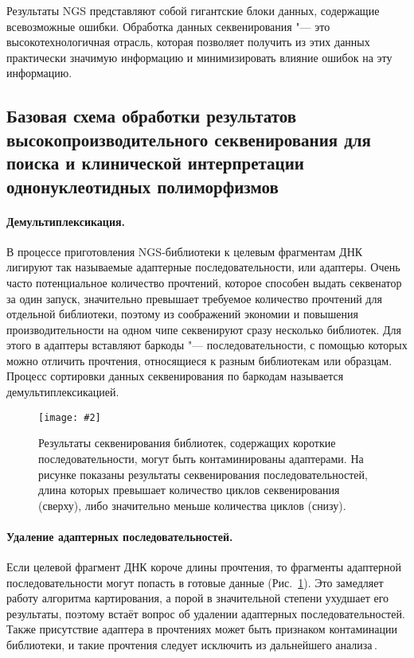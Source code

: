 \documentclass[a4paper,14pt]{extarticle}
\newcommand{\centerfigure}[5]
{\begin{figure}[#1]\centering\texttt{[image: \#2]}\caption{\label{#3}#4}\end{figure}}
\newcommand{\picref}[1]{Рис.~\ref{#1}}
\begin{document}
Результаты NGS представляют собой гигантские блоки данных, содержащие всевозможные ошибки.
Обработка данных секвенирования "--- это высокотехнологичная отрасль, которая позволяет получить из этих данных практически значимую информацию и минимизировать влияние ошибок на эту информацию.

\subsection{Базовая схема обработки результатов высокопроизводительного секвенирования для поиска и клинической интерпретации однонуклеотидных полиморфизмов}

\paragraph{Демультиплексикация.}
В процессе приготовления NGS\hyp{}библиотеки к целевым фрагментам ДНК лигируют так называемые адаптерные последовательности, или адаптеры.
Очень часто потенциальное количество прочтений, которое способен выдать секвенатор за один запуск, значительно превышает требуемое количество прочтений для отдельной библиотеки, поэтому из соображений экономии и повышения производительности на одном чипе секвенируют сразу несколько библиотек.
Для этого в адаптеры вставляют баркоды "--- последовательности, с помощью которых можно отличить прочтения, относящиеся к разным библиотекам или образцам.
Процесс сортировки данных секвенирования по баркодам называется демультиплексикацией.

\centerfigure{h}{Adapters.pdf}{fig:adapters}{Результаты секвенирования библиотек, содержащих короткие последовательности, могут быть контаминированы адаптерами. На рисунке показаны результаты секвенирования последовательностей, длина которых превышает количество циклов секвенирования (сверху), либо значительно меньше количества циклов (снизу).}{0.7}

\paragraph{Удаление адаптерных последовательностей.}
Если целевой фрагмент ДНК короче длины прочтения, то фрагменты адаптерной последовательности могут попасть в готовые данные (\picref{fig:adapters}).
Это замедляет работу алгоритма картирования, а порой в значительной степени ухудшает его результаты, поэтому встаёт вопрос об удалении адаптерных последовательностей.
Также присутствие адаптера в прочтениях может быть признаком контаминации библиотеки, и такие прочтения следует исключить из дальнейшего анализа\,\citep{Martin_2011}.
\end{document}
